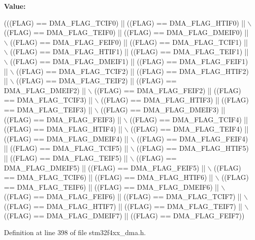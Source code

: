 {\bfseries Value\+:}
\begin{DoxyCode}
(((FLAG) == DMA\_FLAG\_TCIF0)  || ((FLAG) == DMA\_FLAG\_HTIF0)  || \(\backslash\)
                               ((FLAG) == DMA\_FLAG\_TEIF0)  || ((FLAG) == DMA\_FLAG\_DMEIF0) || \(\backslash\)
                               ((FLAG) == DMA\_FLAG\_FEIF0)  || ((FLAG) == DMA\_FLAG\_TCIF1)  || \(\backslash\)
                               ((FLAG) == DMA\_FLAG\_HTIF1)  || ((FLAG) == DMA\_FLAG\_TEIF1)  || \(\backslash\)
                               ((FLAG) == DMA\_FLAG\_DMEIF1) || ((FLAG) == DMA\_FLAG\_FEIF1)  || \(\backslash\)
                               ((FLAG) == DMA\_FLAG\_TCIF2)  || ((FLAG) == DMA\_FLAG\_HTIF2)  || \(\backslash\)
                               ((FLAG) == DMA\_FLAG\_TEIF2)  || ((FLAG) == DMA\_FLAG\_DMEIF2) || \(\backslash\)
                               ((FLAG) == DMA\_FLAG\_FEIF2)  || ((FLAG) == DMA\_FLAG\_TCIF3)  || \(\backslash\)
                               ((FLAG) == DMA\_FLAG\_HTIF3)  || ((FLAG) == DMA\_FLAG\_TEIF3)  || \(\backslash\)
                               ((FLAG) == DMA\_FLAG\_DMEIF3) || ((FLAG) == DMA\_FLAG\_FEIF3)  || \(\backslash\)
                               ((FLAG) == DMA\_FLAG\_TCIF4)  || ((FLAG) == DMA\_FLAG\_HTIF4)  || \(\backslash\)
                               ((FLAG) == DMA\_FLAG\_TEIF4)  || ((FLAG) == DMA\_FLAG\_DMEIF4) || \(\backslash\)
                               ((FLAG) == DMA\_FLAG\_FEIF4)  || ((FLAG) == DMA\_FLAG\_TCIF5)  || \(\backslash\)
                               ((FLAG) == DMA\_FLAG\_HTIF5)  || ((FLAG) == DMA\_FLAG\_TEIF5)  || \(\backslash\)
                               ((FLAG) == DMA\_FLAG\_DMEIF5) || ((FLAG) == DMA\_FLAG\_FEIF5)  || \(\backslash\)
                               ((FLAG) == DMA\_FLAG\_TCIF6)  || ((FLAG) == DMA\_FLAG\_HTIF6)  || \(\backslash\)
                               ((FLAG) == DMA\_FLAG\_TEIF6)  || ((FLAG) == DMA\_FLAG\_DMEIF6) || \(\backslash\)
                               ((FLAG) == DMA\_FLAG\_FEIF6)  || ((FLAG) == DMA\_FLAG\_TCIF7)  || \(\backslash\)
                               ((FLAG) == DMA\_FLAG\_HTIF7)  || ((FLAG) == DMA\_FLAG\_TEIF7)  || \(\backslash\)
                               ((FLAG) == DMA\_FLAG\_DMEIF7) || ((FLAG) == DMA\_FLAG\_FEIF7))
\end{DoxyCode}


Definition at line 398 of file stm32f4xx\+\_\+dma.\+h.

